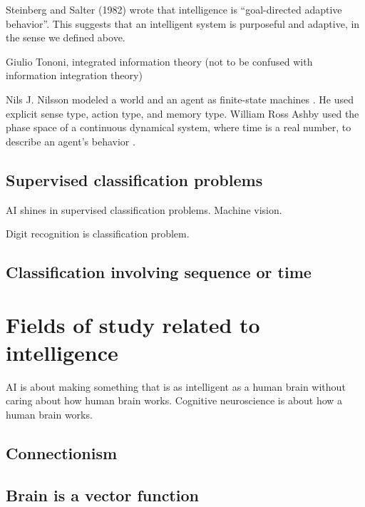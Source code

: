 Steinberg and Salter (1982)
wrote that intelligence is ``goal-directed adaptive behavior''.
This suggests that an intelligent system is purposeful and adaptive,
in the sense we defined above.


\cite{PickeringCyber}
\cite{GoertzelAgi}
\cite{SlomanTuringIrrelevance}

Giulio Tononi, integrated information theory
(not to be confused with information integration theory)

Nils J. Nilsson modeled a world and an agent as finite-state machines \cite{NilsLogicAi}.
He used explicit sense type, action type, and memory type.
William Ross Ashby used the phase space of a continuous dynamical system,
where time is a real number,
to describe an agent's behavior \cite{AshbyBrain}.

\section{Supervised classification problems}

AI shines in supervised classification problems.
Machine vision.

Digit recognition is classification problem.

\section{Classification involving sequence or time}

\chapter{Fields of study related to intelligence}

AI is about making something
that is as intelligent as a human brain
without caring about how human brain works.
Cognitive neuroscience is about how a human brain works.

\section{Connectionism}

\section{Brain is a vector function}

